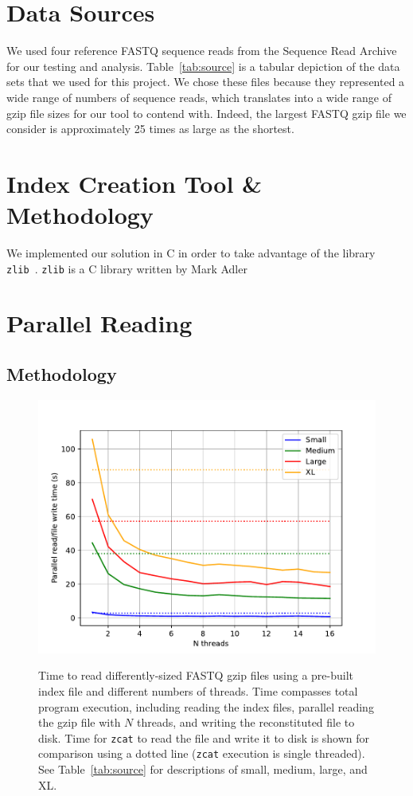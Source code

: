 \documentclass[10pt]{article}
\newcommand{\zlib}{\texttt{zlib}\xspace}
\begin{document}
\section{Data Sources}

We used four reference FASTQ sequence reads from the Sequence Read
Archive~\cite{SRA} for our testing and analysis. Table~\ref{tab:source} is a
tabular depiction of the data sets that we used for this project. We chose these
files because they represented a wide range of numbers of sequence reads, which
translates into a wide range of gzip file sizes for our tool to contend with.
Indeed, the largest FASTQ gzip file we consider is approximately 25 times as
large as the shortest.

\section{Index Creation Tool \& Methodology}

We implemented our solution in C in order to take advantage of the library
\zlib~\cite{zlib}. \zlib is a C library written by Mark Adler

\section{Parallel Reading}

\subsection{Methodology}


\begin{figure}
    \includegraphics[width=\linewidth]{figs/cores.pdf}
    \label{fig:cores}
    \caption{Time to read differently-sized FASTQ gzip files using a pre-built
    index file and different numbers of threads. Time compasses total program
    execution, including reading the index files, parallel reading the gzip
    file with $N$ threads, and writing the reconstituted file to disk. Time for
    \texttt{zcat} to read the file and write it to disk is shown for comparison
    using a dotted line (\texttt{zcat} execution is single threaded). See
    Table~\ref{tab:source} for descriptions of small, medium, large, and XL.}
\end{figure}
\end{document}
